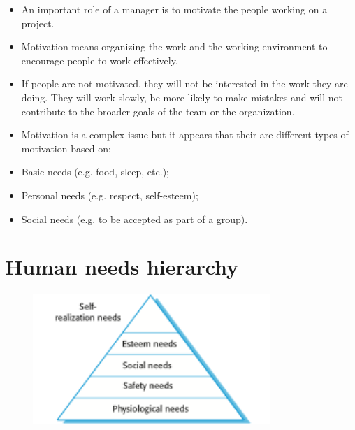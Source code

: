 \begin{itemize}

\item An important role of a manager is to motivate the people working on a project.

\item Motivation means organizing the work and the working environment to encourage people to work effectively.

  \item If people are not motivated, they will not be interested in the work they are doing. They will work slowly, be more likely to make mistakes and will not contribute to the broader goals of the team or the organization.

\item Motivation is a complex issue but it appears that their are different types of motivation based on:

  \item Basic needs (e.g. food, sleep, etc.);   \item Personal needs (e.g. respect, self-esteem);
  \item Social needs (e.g. to be accepted as part of a group).

\end{itemize}
\section{ Human needs hierarchy}
\begin{figure}[h!]
    \centering
    \includegraphics[width = 0.8\textwidth]{./figures/L5_2.png}
    \caption{}
    \label{fig:L5_2}
\end{figure}


